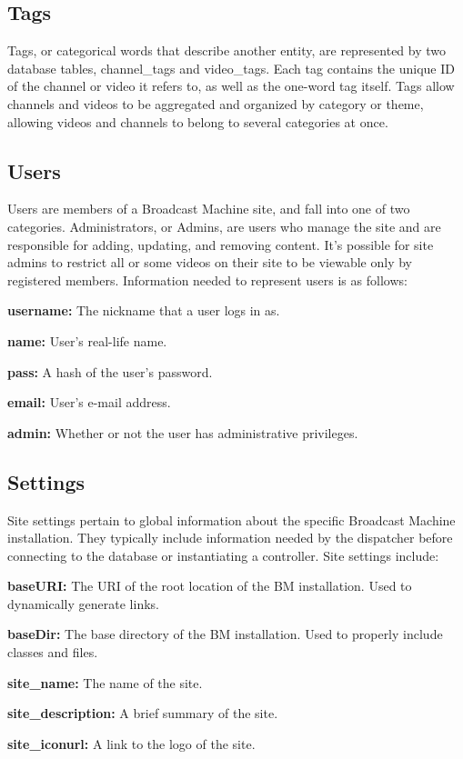 \documentclass[a4paper,12pt]{report}
\begin{document}
\subsection*{Tags}
Tags, or categorical words that describe another entity, are represented by two database tables, channel\_tags and video\_tags. Each tag contains the unique ID of the channel or video it refers to, as well as the one-word tag itself. Tags allow channels and videos to be aggregated and organized by category or theme, allowing videos and channels to belong to several categories at once.

\subsection*{Users}
Users are members of a Broadcast Machine site, and fall into one of two categories. Administrators, or Admins, are users who manage the site and are responsible for adding, updating, and removing content. It's possible for site admins to restrict all or some videos on their site to be viewable only by registered members. Information needed to represent users is as follows:

\begin{description}
\item{\textbf{username: } The nickname that a user logs in as.}
\item{\textbf{name: } User's real-life name.}
\item{\textbf{pass: } A hash of the user's password.}
\item{\textbf{email: } User's e-mail address.}
\item{\textbf{admin: } Whether or not the user has administrative privileges.} \\
\end{description}

\subsection*{Settings}

Site settings pertain to global information about the specific Broadcast Machine installation. They typically include information needed by the dispatcher before connecting to the database or instantiating a controller. Site settings include:

\begin{description}
\item{\textbf{baseURI: } The URI of the root location of the BM installation. Used to dynamically generate links.}
\item{\textbf{baseDir: } The base directory of the BM installation. Used to properly include classes and files.}
\item{\textbf{site\_name: } The name of the site.}
\item{\textbf{site\_description: } A brief summary of the site.}
\item{\textbf{site\_iconurl: } A link to the logo of the site.} \\
\end{description}
\end{document}
